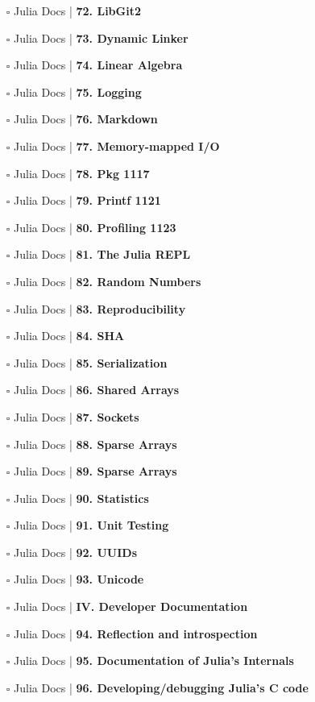 \documentclass[a4, landscape, 12pt]{article}
\newcommand{\checkbox}{$\square$}%
\begin{document}
\begin{itemize}
{}
\item [\checkbox]  Julia Docs | \textbf{ 72. LibGit2
}
\item [\checkbox]  Julia Docs | \textbf{ 73. Dynamic Linker
}
\item [\checkbox]  Julia Docs | \textbf{ 74. Linear Algebra
}
\item [\checkbox]  Julia Docs | \textbf{ 75. Logging
}
\item [\checkbox]  Julia Docs | \textbf{ 76. Markdown
}
\item [\checkbox]  Julia Docs | \textbf{ 77. Memory-mapped I/O
}
\item [\checkbox]  Julia Docs | \textbf{ 78. Pkg 1117
}
\item [\checkbox]  Julia Docs | \textbf{ 79. Printf 1121
}
\item [\checkbox]  Julia Docs | \textbf{ 80. Profiling 1123
}
\item [\checkbox]  Julia Docs | \textbf{ 81. The Julia REPL
}
\item [\checkbox]  Julia Docs | \textbf{ 82. Random Numbers
}
\item [\checkbox]  Julia Docs | \textbf{ 83. Reproducibility
}
\item [\checkbox]  Julia Docs | \textbf{ 84. SHA
}
\item [\checkbox]  Julia Docs | \textbf{ 85. Serialization
}
\item [\checkbox]  Julia Docs | \textbf{ 86. Shared Arrays
}
\item [\checkbox]  Julia Docs | \textbf{ 87. Sockets
}
\item [\checkbox]  Julia Docs | \textbf{ 88. Sparse Arrays
}
\item [\checkbox]  Julia Docs | \textbf{ 89. Sparse Arrays
}
\item [\checkbox]  Julia Docs | \textbf{ 90. Statistics
}
\item [\checkbox]  Julia Docs | \textbf{ 91. Unit Testing
}
\item [\checkbox]  Julia Docs | \textbf{ 92. UUIDs
}
\item [\checkbox]  Julia Docs | \textbf{ 93. Unicode
}
\item [\checkbox]  Julia Docs | \textbf{ IV. Developer Documentation
}
\item [\checkbox]  Julia Docs | \textbf{ 94. Reflection and introspection
}
\item [\checkbox]  Julia Docs | \textbf{ 95. Documentation of Julia’s Internals
}
\item [\checkbox]  Julia Docs | \textbf{ 96. Developing/debugging Julia’s C code
}
\end{itemize}
\end{document}
